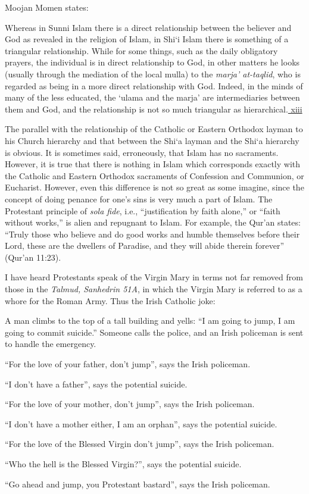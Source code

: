 Moojan Momen states:

\begin{quotex}
Whereas in Sunni Islam there is a direct relationship between the believer and God as revealed in the religion of Islam, in Shi`i Islam there is something of a triangular relationship. While for some things, such as the daily obligatory prayers, the individual is in direct relationship to God, in other matters he looks (usually through the mediation of the local mulla) to the \emph{marja' at-taqlid}, who is regarded as being in a more direct relationship with God. Indeed, in the minds of many of the less educated, the `ulama and the marja' are intermediaries between them and God, and the relationship is not so much triangular as hierarchical.\hyperref[_edn13]{ xiii }
\end{quotex}


The parallel with the relationship of the Catholic or Eastern Orthodox layman to his Church hierarchy and that between the Shi`a layman and the Shi`a hierarchy is obvious. It is sometimes said, erroneously, that Islam has no sacraments. However, it is true that there is nothing in Islam which corresponds exactly with the Catholic and Eastern Orthodox sacraments of Confession and Communion, or Eucharist. However, even this difference is not so great as some imagine, since the concept of doing penance for one's sins is very much a part of Islam. The Protestant principle of \emph{sola fide}, i.e., ``justification by faith alone,'' or ``faith without works,'' is alien and repugnant to Islam. For example, the Qur'an states: ``Truly those who believe and do good works and humble themselves before their Lord, these are the dwellers of Paradise, and they will abide therein forever'' (Qur'an 11:23).

I have heard Protestants speak of the Virgin Mary in terms not far removed from those in the \emph{Talmud, Sanhedrin 51A}, in which the Virgin Mary is referred to as a whore for the Roman Army. Thus the Irish Catholic joke:

\begin{quotex}
A man climbs to the top of a tall building and yells: ``I am going to jump, I am going to commit suicide.'' Someone calls the police, and an Irish policeman is sent to handle the emergency.

``For the love of your father, don't jump'', says the Irish policeman.

``I don't have a father'', says the potential suicide.

``For the love of your mother, don't jump'', says the Irish policeman.

``I don't have a mother either, I am an orphan'', says the potential suicide.

``For the love of the Blessed Virgin don't jump'', says the Irish policeman.

``Who the hell is the Blessed Virgin?'', says the potential suicide.

``Go ahead and jump, you Protestant bastard'', says the Irish policeman.
\end{quotex}


